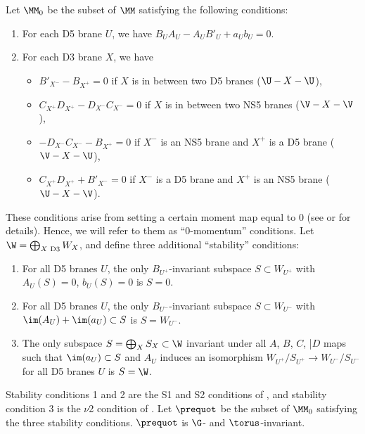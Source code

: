 Let $\MM_0$ be the subset of $\MM$ satisfying the following conditions:
\begin{enumerate}\itemsep=0pt
\item[(1)] For each D5 brane $U$, we have $B_UA_U - A_UB'_U + a_Ub_U = 0$.
\item[(2)] For each D3 brane $X$, we have
\begin{itemize}\itemsep=0pt
\item $B'_{X^-} - B_{X^+} = 0$ if $X$ is in between two D5 branes ($\U-X-\U$),
\item $C_{X^+}D_{X^+} - D_{X^-}C_{X^-} = 0$ if $X$ is in between two NS5 branes ($\V-X-\V$),
\item $-D_{X^-}C_{X^-} - B_{X^+} = 0$ if $X^-$ is an NS5 brane and $X^+$ is a D5 brane ($\V-X-\U$),
\item $C_{X^+}D_{X^+} + B'_{X^-} = 0$ if $X^-$ is a D5 brane and $X^+$ is an NS5 brane ($\U-X-\V$).
\end{itemize}
\end{enumerate}
These conditions arise from setting a certain moment map equal to 0 (see \cite{NT} or \cite{RS} for details). Hence, we will refer to them as ``0-momentum'' conditions. Let $\W = \bigoplus_{X\text{ D3}} W_X$, and define three additional ``stability'' conditions:
\begin{enumerate}\itemsep=0pt
\item[(1)] For all D5 branes $U$, the only $B_{U^+}$-invariant subspace $S\subset W_{U^+}$ with $A_U(S) = 0$, $b_U(S) = 0$ is $S=0$.
\item[(2)] For all D5 branes $U$, the only $B_{U^-}$-invariant subspace $S\subset W_{U^-}$ with $\im(A_U)+\im(a_U) \subset S$ is $S=W_{U^-}$.
\item[(3)] The only subspace $S=\bigoplus_X S_X\subset \W$ invariant under all $A$, $B$, $C$, |$D$ maps such that $\im(a_U) \subset S$ and $A_U$ induces an isomorphism $W_{U^+}/S_{U^+}\to W_{U^-}/S_{U^-}$ for all D5 branes $U$ is $S=\W$.
\end{enumerate}
Stability conditions 1 and 2 are the S1 and S2 conditions of \cite[Section~2.2]{NT}, and stability condition 3 is the $\nu$2 condition of \cite[Section~2.4]{NT}. Let $\prequot$ be the subset of $\MM_0$ satisfying the three stability conditions. $\prequot$ is $\G$- and $\torus$-invariant.

